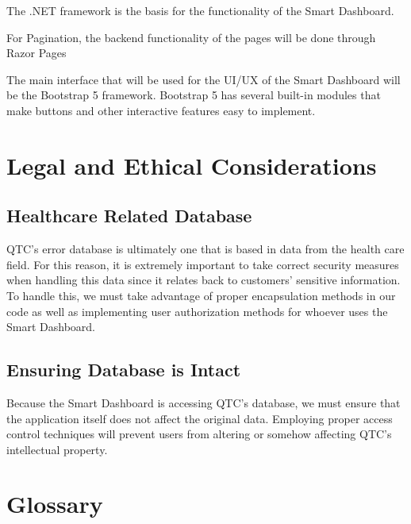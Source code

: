 \documentclass{article}
\begin{document}
The .NET framework is the basis for the functionality of the Smart Dashboard.

For Pagination, the backend functionality of the pages will be done through Razor Pages

The main interface that will be used for the UI/UX of the Smart Dashboard will be the Bootstrap 5 framework. Bootstrap 5 has several built-in modules that make buttons and other interactive features easy to implement.



\section{Legal and Ethical Considerations}

\subsection{Healthcare Related Database}
QTC's error database is ultimately one that is based in data from the health care field. For this reason, it is extremely important to take correct security measures when handling this data since it relates back to customers' sensitive information. To handle this, we must take advantage of proper encapsulation methods in our code as well as implementing user authorization methods for whoever uses the Smart Dashboard.

\subsection{Ensuring Database is Intact}
Because the Smart Dashboard is accessing QTC's database, we must ensure that the application itself does not affect the original data. Employing proper access control techniques will prevent users from altering or somehow affecting QTC's intellectual property.



\section{Glossary}
\end{document}
